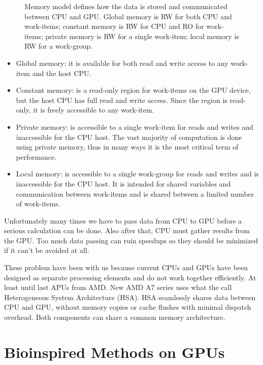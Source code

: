 \documentclass[review]{elsarticle}
\begin{document}
\begin{figure}
\centerline{}
\caption{Memory model defines how the data is stored and communicated between CPU and GPU. Global memory is RW for both CPU and work-items; constant memory is RW for CPU and RO for work-items; private memory is RW for a single work-item; local memory is RW for a work-group.}
\label{figure:memory}
\end{figure}

\begin{itemize}
\item Global memory: it is available for both read and write access to any work-item and the host CPU.
\item Constant memory: is a read-only region for work-items on the GPU device, but the host CPU has full read and write access. Since the region is read-only, it is freely accessible to any work-item.
\item Private memory: is accessible to a single work-item for reads and writes and inaccessible for the CPU host. The vast majority of computation is done using private memory, thus in many ways it is the most critical term of performance.
\item Local memory: is accessible to a single work-group for reads and writes and is inaccessible for the CPU host. It is intended for shared variables and communication between work-items and is shared between a limited number of work-items.
\end{itemize} 

Unfortunately many times we have to pass data from CPU to GPU before a serious calculation can be done. Also after that, CPU must gather results from the GPU. Too much data passing can ruin speedups so they should be minimized if it can't be avoided at all.

These problem have been with us because current CPUs and GPUs have been designed as separate processing elements and do not work together efficiently. At least until last APUs from AMD. New AMD A7 series uses what the call Heterogeneous System Architecture (HSA). HSA seamlessly shares data between CPU and GPU, without memory copies or cache flushes with minimal dispatch overhead. Both components can share a common memory architecture.

\section{Bioinspired Methods on GPUs}
\label{sec:bioinfor_apps}
\end{document}
